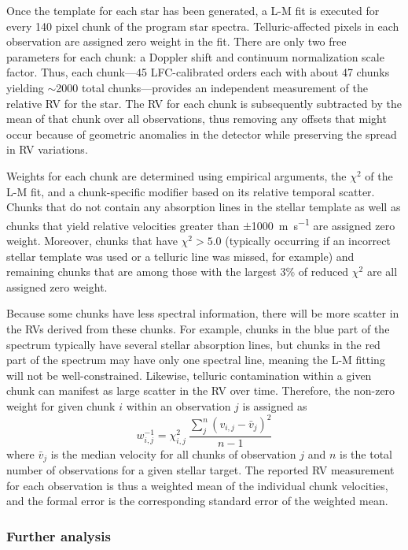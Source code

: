 Once the template for each star has been generated, a L-M fit is executed for every 140 pixel chunk of the program star spectra. Telluric-affected pixels in each observation are assigned zero weight in the fit. There are only two free parameters for each chunk: a Doppler shift and continuum normalization scale factor. Thus, each chunk---45 LFC-calibrated orders each with about 47 chunks yielding $\sim$2000 total chunks---provides an independent measurement of the relative RV for the star. The RV for each chunk is subsequently subtracted by the mean of that chunk over all observations, thus removing any offsets that might occur because of geometric anomalies in the detector while preserving the spread in RV variations.

Weights for each chunk are determined using empirical arguments, the $\chi^2$ of the L-M fit, and a chunk-specific modifier based on its relative temporal scatter. Chunks that do not contain any absorption lines in the stellar template as well as chunks that yield relative velocities greater than $\pm$1000~\si{\meter\per\second} are assigned zero weight. Moreover, chunks that have $\chi^2 > 5.0$ (typically occurring if an incorrect stellar template was used or a telluric line was missed, for example) and remaining chunks that are among those with the largest 3\% of reduced $\chi^2$ are all assigned zero weight.

Because some chunks have less spectral information, there will be more scatter in the RVs derived from these chunks. For example, chunks in the blue part of the spectrum typically have several stellar absorption lines, but chunks in the red part of the spectrum may have only one spectral line, meaning the L-M fitting will not be well-constrained. Likewise, telluric contamination within a given chunk can manifest as large scatter in the RV over time. Therefore, the non-zero weight for given chunk $i$ within an observation $j$ is assigned as
\begin{equation}
    w_{i,j}^{-1} = \chi^2_{i,j}~\frac{\sum_{j}^{n} (v_{i,j} - \bar{v}_{j})^2}{n-1}
    \label{eq:chunk-weight}
\end{equation}
where $\bar{v}_{j}$ is the median velocity for all chunks of observation $j$ and $n$ is the total number of observations for a given stellar target. The reported RV measurement for each observation is thus a weighted mean of the individual chunk velocities, and the formal error is the corresponding standard error of the weighted mean.

\subsubsection{Further analysis}
\label{pipeline:further-analysis}

